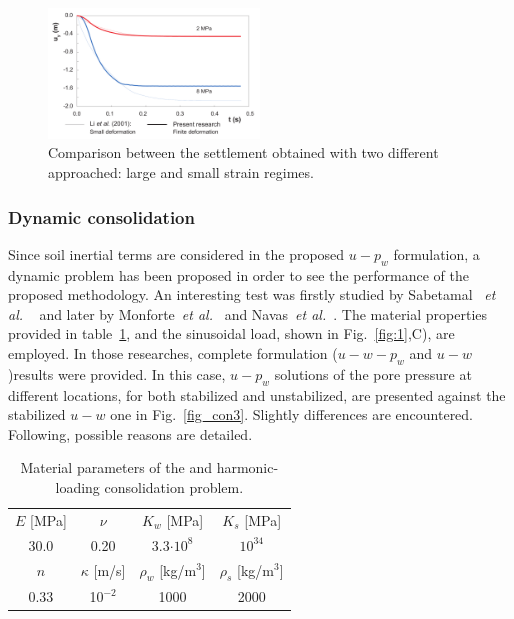 \documentclass[twocolumn]{svjour3}          %
\newcommand{\etal}{
  \textit{et al.}
}
\begin{document}
\begin{figure}
  \includegraphics[width=0.5\textwidth]{Fig/borja2.pdf}
\caption{Comparison between the settlement obtained with two different approached: large and small strain regimes.}
\label{fig:6}      
\end{figure}

\subsubsection{Dynamic consolidation}
\label{sec:5:1:2}

Since soil inertial terms are considered in the proposed $u-p_w$ formulation, a dynamic problem has been proposed in order to see the performance of the proposed methodology. An interesting test was firstly studied by Sabetamal~\etal~\cite{Sabetamal:2015} and later by Monforte~\textit{et al.}~\cite{Monforte2019} and Navas~\textit{et al.}~\cite{Navas2020b}. The material properties provided in table~\ref{tab:2}, and the sinusoidal load, shown in Fig.~\ref{fig:1},C), are employed. In those researches, complete formulation ($u-w-p_w$ and  $u-w$ )results were provided. In this case, $u-p_w$ solutions of the pore pressure at different locations, for both stabilized and unstabilized, are presented against the stabilized $u-w$ one in Fig.~\ref{fig_con3}. Slightly differences are encountered. Following, possible reasons are detailed.

\begin{table}[!t]
\centering
\caption{ Material parameters of the and harmonic-loading consolidation problem.} \label{tab:2}
	\vspace*{0.2cm}
	\begin{tabular}{cccc}
$E$ [MPa] & $\nu$ & $K_w$ [MPa] & $K_s$ [MPa] \\
		\noalign{\smallskip}\hline\noalign{\smallskip}
	 30.0& 0.20 & 3.3$\cdot 10^8$ & $10^{34}$ \\
	 \noalign{\smallskip}\hline\hline\noalign{\smallskip}
	  $n$ & $\kappa$ [m/s] & $\rho_w$ [kg/$\textrm{m}^3$] & $\rho_s$ [kg/$\textrm{m}^3$]\\
	  \noalign{\smallskip}\hline\noalign{\smallskip}
	  0.33  & 10$^{-2} $& 1000 & 2000
	\end{tabular}
\end{table}
\end{document}
